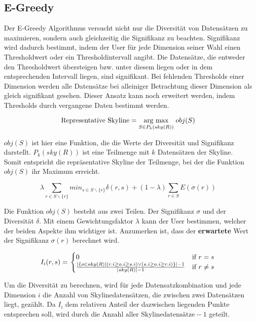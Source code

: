 \subsection{E-Greedy}
\label{ch:Analyse:sec:repSkyAlgos:subsec:eGreedy}
Der E-Greedy Algorithmus \cite{magnani2014taking} versucht nicht nur die Diversität von Datensätzen zu maximieren, sondern auch gleichzeitig die Signifikanz zu beachten.
Signifikanz wird dadurch bestimmt, indem der User für jede Dimension seiner Wahl einen Thresholdwert oder ein Thresholdintervall angibt. Die Datensätze, die entweder den Thresholdwert übersteigen bzw. unter diesem liegen oder in dem entsprechenden Intervall liegen, sind signifikant. Bei fehlenden Thresholds einer Dimension werden alle Datensätze bei alleiniger Betrachtung dieser Dimension als gleich signifikant gesehen. Dieser Ansatz kann noch erweitert werden, indem Thresholds durch vergangene Daten bestimmt werden. 

$$\text{Representative Skyline} = \underset{S \in{P_k(sky(R))}}{\operatorname{arg}\,\operatorname{max}}\; obj(S)$$

$obj(S)$ ist hier eine Funktion, die die Werte der Diversität und Signifikanz darstellt. $P_k(sky(R))$ ist eine Teilmenge mit $k$ Datensätzen der Skyline. Somit entspricht die repräsentative Skyline der Teilmenge, bei der die Funktion $obj(S)$ ihr Maximum erreicht.

$$\lambda \sum\limits_{r \in{S \backslash \{r\}}} min_{s \in S \backslash \{r\}}\delta(r,s)+(1- \lambda) \sum\limits_{r \in{S}}E(\sigma(r))$$

Die Funktion $obj(S)$ besteht aus zwei Teilen. Der Signifikanz $\sigma$ und der Diversität $\delta$.
Mit einem Gewichtungsfaktor $\lambda$ kann der User bestimmen, welcher der beiden Aspekte ihm wichtiger ist. Anzumerken ist, dass der \textbf{erwartete} Wert der Signifikanz $\sigma(r)$ berechnet wird. 

$$\begin{displaystyle}
  I_i(r, s) = \left.
  \begin{cases}
    0 & \text{if } r=s \\
    \frac{|\{o \in{sky(R)}| (r.i \geq o.i \geq s.i) \lor (s.i \geq o.i \geq r.i)\}|-1}{|sky(R)|-1} & \text{if } r \neq s
  \end{cases}
  \right.
\end{displaystyle}$$

Um die Diversität zu berechnen, wird für jede Datensatzkombination und jede Dimension $i$ die Anzahl von Skylinedatensätzen, die zwischen zwei Datensätzen liegt, gezählt. Da $I_i$ dem relativen Anteil der dazwischen liegenden Punkte entsprechen soll, wird durch die $\text{Anzahl aller Skylinedatensätze}-1$ geteilt.

